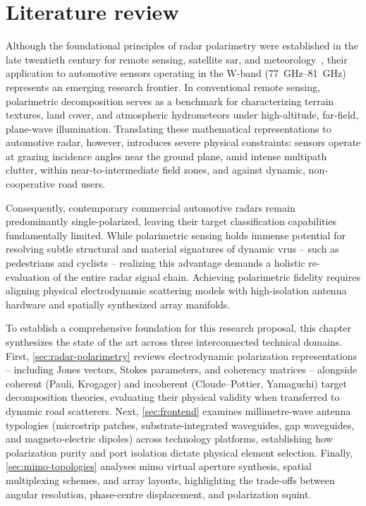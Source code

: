 \chapter{Literature review}
\label{chap:literature-review}

Although the foundational principles of radar polarimetry were established in the late twentieth century for remote sensing, satellite \gls{sar}, and meteorology~\parencite{leePolarimetricRadarImaging2017}, their application to automotive sensors operating in the W-band (\qtyrange{77}{81}{GHz}) represents an emerging research frontier.
In conventional remote sensing, polarimetric decomposition serves as a benchmark for characterizing terrain textures, land cover, and atmospheric hydrometeors under high-altitude, far-field, plane-wave illumination.
Translating these mathematical representations to automotive radar, however, introduces severe physical constraints: sensors operate at grazing incidence angles near the ground plane, amid intense multipath clutter, within near-to-intermediate field zones, and against dynamic, non-cooperative road users.

Consequently, contemporary commercial automotive radars remain predominantly single-polarized, leaving their target classification capabilities fundamentally limited.
While polarimetric sensing holds immense potential for resolving subtle structural and material signatures of dynamic \glspl{vru} -- such as pedestrians and cyclists -- realizing this advantage demands a holistic re-evaluation of the entire radar signal chain.
Achieving polarimetric fidelity requires aligning physical electrodynamic scattering models with high-isolation antenna hardware and spatially synthesized array manifolds.

To establish a comprehensive foundation for this research proposal, this chapter synthesizes the state of the art across three interconnected technical domains.
First, \cref{sec:radar-polarimetry} reviews electrodynamic polarization representations -- including Jones vectors, Stokes parameters, and coherency matrices -- alongside coherent (Pauli, Krogager) and incoherent (Cloude--Pottier, Yamaguchi) target decomposition theories, evaluating their physical validity when transferred to dynamic road scatterers.
Next, \cref{sec:frontend} examines millimetre-wave antenna typologies (microstrip patches, substrate-integrated waveguides, gap waveguides, and magneto-electric dipoles) across technology platforms, establishing how polarization purity and port isolation dictate physical element selection.
Finally, \cref{sec:mimo-topologies} analyses \gls{mimo} virtual aperture synthesis, spatial multiplexing schemes, and array layouts, highlighting the trade-offs between angular resolution, phase-centre displacement, and polarization squint.


